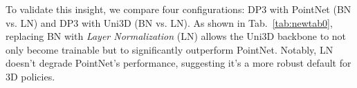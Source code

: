 \documentclass[runningheads]{llncs}
\begin{document}
To validate this insight, we compare four configurations: DP3 with PointNet (BN vs. LN) and DP3 with Uni3D (BN vs. LN). As shown in Tab.~\ref{tab:newtab0}, replacing BN with \emph{Layer Normalization} (LN) allows the Uni3D backbone to not only become trainable but to significantly outperform PointNet. Notably, LN doesn't degrade PointNet's performance, suggesting it's a more robust default for 3D policies.
\begin{table}[]
\centering
\small
\captionsetup{justification=centering}

\begin{minipage}[]{0.48\textwidth} %
    \centering
    \caption{\textbf{Lessons in BN vs. LN.} \\We use DP3\cite{ze20243d} default hyperparameters for training.}
    \label{tab:newtab0}
\end{minipage}
\hfill %
\begin{minipage}[]{0.48\textwidth}

\end{minipage}
\end{table}
\end{document}
